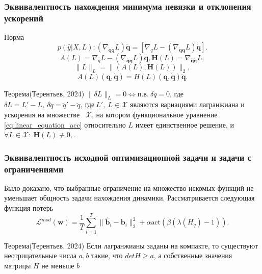 \documentclass{beamer}
\begin{document}
\begin{frame}
\frametitle{Эквивалентность нахождения минимума невязки и отклонения ускорений}
\begin{block} {Норма}
\[
p(\hat{y}| X, L): \left(\nabla_{\dot{\mathbf{q}} \dot{\mathbf{q}}} L\right)\ddot{\mathbf{q}} = \left[\nabla_{q} L-\left(\nabla_{\dot{\mathbf{q}}\mathbf{q}} L\right) \dot{\mathbf{q}}\right].
\]
$$A(L) = \nabla_{q} L-\left(\nabla_{\dot{\mathbf{q}}\mathbf{q}} L\right) \dot{\mathbf{q}}, \mathbf{H}(L) = \nabla_{\dot{\mathbf{q}} \dot{\mathbf{q}}} L,$$
$$\|L\|_L = \|(A(L), \mathbf{H}(L))\|_2,$$
\begin{equation}\label{eq:linear_equation_acc}
A(L)(\mathbf{q}, \dot{\mathbf{q}}) = H(L)(\mathbf{q}, \dot{\mathbf{q}})\ddot{\mathbf{q}}.
\end{equation}
\end{block}

\begin{block} {Теорема(Терентьев, 2024)}
$\|\delta L\|_L = 0 \Leftrightarrow \text{п.в.}~\delta \ddot{q} = 0$, где $\delta L = L' - L, ~\delta \ddot{q} = \ddot{q}' - \ddot{q}, ~\text{где} \ L',\ L \in \mathcal {X}$ являются вариациями лагранжиана и ускорения на множестве ~$\mathcal {X}$, на котором функциональное уравнение \ref{eq:linear_equation_acc} относительно $L$ имеет единственное решение, и $\forall L\in \mathcal{X}:~\mathbf{H}(L) \not\equiv 0, $.
\end{block}

\end{frame}



\begin{frame}
\frametitle{Эквивалентность исходной оптимизационной задачи и задачи с ограничениями}

Было доказано, что выбранные ограничение на множество искомых функций не уменьшает общность задачи нахождения динамики. Рассматривается следующая функция потерь
$$
 \mathcal{L}^{mod}(\textbf{w}) = \frac{1}{T}\sum_{i=1}^{T} \| \mathbf{\hat{b}}_i - \mathbf{b}_i \|_2^2  + \alpha \text{act}(\beta (\lambda(H_{\ddot{q}}) - 1)).
$$

\begin{block} {Теорема(Терентьев, 2024)}
Если лагранжианы заданы на компакте, то существуют неотрицательные числа $a, b$ такие, что $det H \ge a$, а собственные значения матрицы $H$ не меньше $b$
\end{block} 
\end{frame}
\end{document}
